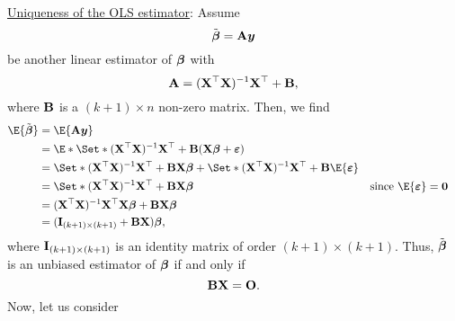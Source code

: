 \underline{Uniqueness of the OLS estimator}: Assume
\[ \tilde{{\boldsymbol \beta}}=\mathbf{A}{\boldsymbol y} \]
be another linear estimator of $ {\boldsymbol \beta} $ with
\[ \mathbf{A}=(\mathbf{X}^\top \mathbf{X})^{-1}\mathbf{X}^\top + \mathbf{B}, \]
where $ \mathbf{B} $ is a $ (k+1)\times n $ non-zero matrix. Then, we find
\begin{align*}
    \E{\tilde{\Vector{\beta}}}
     & =\E{\Matrix{A}\Vector{y}}                                                                                                                                                                                                                            \\
     & =\E*{\Set*{(\Matrix{X}^\top \Matrix{X})^{-1}\Matrix{X}^\top + \Matrix{B}}(\Matrix{X}\Vector{\beta}+\Vector{\varepsilon})}                                                                                                                            \\
     & =\Set*{(\Matrix{X}^\top \Matrix{X})^{-1}\Matrix{X}^\top + \Matrix{B}}\Matrix{X}\Vector{\beta}+\Set*{(\Matrix{X}^\top \Matrix{X})^{-1}\Matrix{X}^\top + \Matrix{B}}\E{\Vector{\varepsilon}}                                                           \\
     & =\Set*{(\Matrix{X}^\top \Matrix{X})^{-1}\Matrix{X}^\top + \Matrix{B}}\Matrix{X}\Vector{\beta}                                                                                              &  & \text{since $ \E{\Vector{\varepsilon}}=\Vector{0} $} \\
     & =(\Matrix{X}^\top \Matrix{X})^{-1}\Matrix{X}^\top \Matrix{X}\Vector{\beta}+\Matrix{B}\Matrix{X}\Vector{\beta}                                                                                                                                        \\
     & =(\Matrix{I}_{(k+1)\times(k+1)}+\Matrix{B}\Matrix{X})\Vector{\beta},
\end{align*}
where $ \mathbf{I}_{(k+1)\times(k+1)} $ is an identity matrix of
order $ (k+1)\times(k+1) $. Thus, $ \tilde{{\boldsymbol \beta}} $
is an unbiased estimator of $ {\boldsymbol \beta} $ if and only if
\[ \mathbf{B}\mathbf{X}=\mathbf{O}. \]
Now, let us consider
